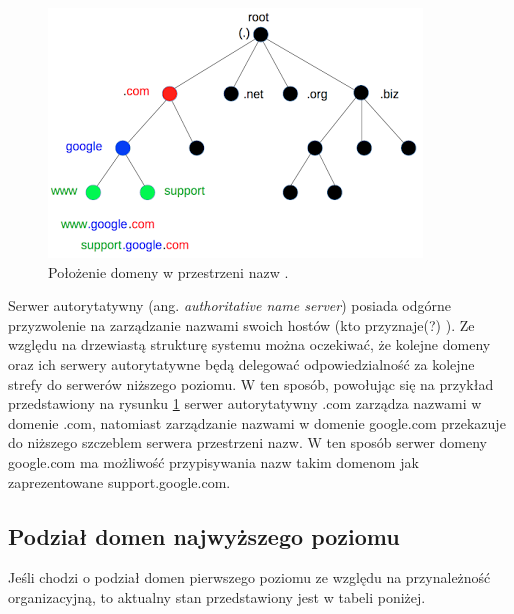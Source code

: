 \begin{center}
	\begin{figure}
	\includegraphics[scale=1]{image/domain_tree}
	\caption{Położenie domeny w przestrzeni nazw \cite{domain_tree_src}.}
	\label{example_domain_tree}
	\end{figure}
\end{center}

Serwer autorytatywny (ang. \textit{authoritative name server}) posiada odgórne przyzwolenie na zarządzanie nazwami swoich hostów
(kto przyznaje(?) \cite{toDoWarning}). Ze względu na drzewiastą strukturę systemu można oczekiwać, że kolejne domeny oraz ich serwery
autorytatywne będą delegować odpowiedzialność za kolejne strefy do serwerów niższego poziomu. W ten sposób, powołując się na przykład
przedstawiony na rysunku \ref{example_domain_tree} serwer autorytatywny .com zarządza nazwami w domenie .com, natomiast zarządzanie
nazwami w domenie google.com przekazuje do niższego szczeblem serwera przestrzeni nazw. W ten sposób serwer domeny google.com ma
możliwość przypisywania nazw takim domenom jak zaprezentowane support.google.com.

\subsection{Podział domen najwyższego poziomu}
Jeśli chodzi o podział domen pierwszego poziomu ze względu na przynależność organizacyjną, to aktualny stan przedstawiony jest w
tabeli poniżej.

